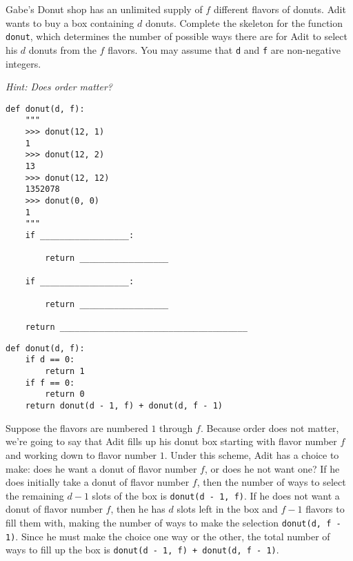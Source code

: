 \begin{blocksection}
\question Gabe's Donut shop has an unlimited supply of $f$ different flavors of donuts. Adit wants to buy a box containing $d$ donuts.
Complete the skeleton for the function \lstinline{donut}, which determines the number of possible ways there are for Adit to select his
 $d$ donuts from the $f$ flavors. You may assume that \lstinline{d} and \lstinline{f} are non-negative integers. 

\textit{Hint: Does order matter?}

\begin{lstlisting}
def donut(d, f):
    """
    >>> donut(12, 1)
    1
    >>> donut(12, 2)
    13
    >>> donut(12, 12)
    1352078
    >>> donut(0, 0)
    1
    """
    if __________________:

        return __________________

    if __________________:

        return __________________

    return ______________________________________
\end{lstlisting}

\begin{solution}[0in]
\begin{lstlisting}
def donut(d, f):
    if d == 0:
        return 1
    if f == 0:
        return 0
    return donut(d - 1, f) + donut(d, f - 1)
\end{lstlisting}

Suppose the flavors are numbered $1$ through $f$. Because order does not matter, we're going to say that Adit fills up his donut box starting with flavor number $f$ and working down to flavor number $1$. Under this scheme, Adit has a choice to make: does he want a donut of flavor number $f$, or does he not want one? If he does initially take a donut of flavor number $f$, then the number of ways to select the remaining $d - 1$ slots of the box is \lstinline{donut(d - 1, f)}. If he does not want a donut of flavor number $f$, then he has $d$ slots left in the box and $f - 1$ flavors to fill them with, making the number of ways to make the selection \lstinline{donut(d, f - 1)}. Since he must make the choice one way or the other, the total number of ways to fill up the box is \lstinline{donut(d - 1, f) + donut(d, f - 1)}. 
\end{solution}
\end{blocksection}

